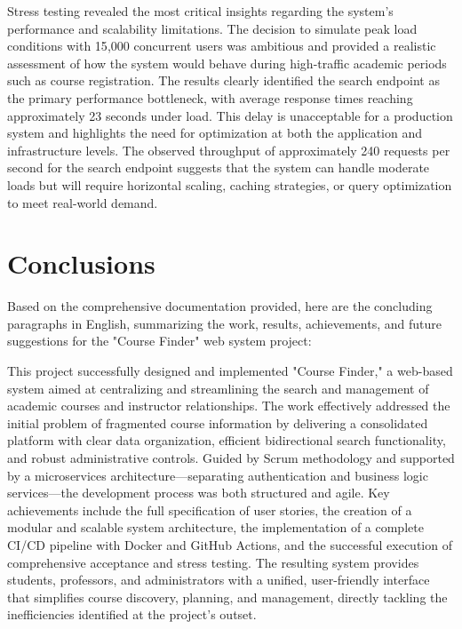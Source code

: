 \documentclass[12pt,a4paper]{article}
\begin{document}
Stress testing revealed the most critical insights regarding the system's performance and scalability limitations. The decision to simulate peak load conditions with 15{,}000 concurrent users was ambitious and provided a realistic assessment of how the system would behave during high-traffic academic periods such as course registration. The results clearly identified the search endpoint as the primary performance bottleneck, with average response times reaching approximately 23 seconds under load. This delay is unacceptable for a production system and highlights the need for optimization at both the application and infrastructure levels. The observed throughput of approximately 240 requests per second for the search endpoint suggests that the system can handle moderate loads but will require horizontal scaling, caching strategies, or query optimization to meet real-world demand.\newline
\section{Conclusions}
\label{sec:conclusions}
Based on the comprehensive documentation provided, here are the concluding paragraphs in English, summarizing the work, results, achievements, and future suggestions for the "Course Finder" web system project:

This project successfully designed and implemented "Course Finder," a web-based system aimed at centralizing and streamlining the search and management of academic courses and instructor relationships. The work effectively addressed the initial problem of fragmented course information by delivering a consolidated platform with clear data organization, efficient bidirectional search functionality, and robust administrative controls. Guided by Scrum methodology and supported by a microservices architecture—separating authentication and business logic services—the development process was both structured and agile. Key achievements include the full specification of user stories, the creation of a modular and scalable system architecture, the implementation of a complete CI/CD pipeline with Docker and GitHub Actions, and the successful execution of comprehensive acceptance and stress testing. The resulting system provides students, professors, and administrators with a unified, user-friendly interface that simplifies course discovery, planning, and management, directly tackling the inefficiencies identified at the project's outset.
\end{document}
